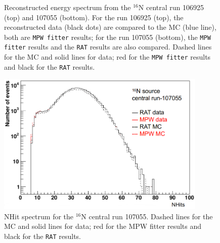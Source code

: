 \begin{figure}[htbp]
	\centering
	\caption[Reconstructed energy spectrum from the $^{16}$N central run 106925 and 107055.]{Reconstructed energy spectrum from the $^{16}$N central run 106925 (top) and 107055 (bottom). For the run 106925 (top), the reconstructed data (black dots) are compared to the MC (blue line), both are \texttt{MPW fitter} results; for the run 107055 (bottom), the \texttt{MPW fitter} results and the \texttt{RAT} results are also compared. Dashed lines for the MC and solid lines for data; red for the \texttt{MPW fitter} results and black for the \texttt{RAT} results.}
	\label{fig:N16energy}	
\end{figure}

\begin{figure}[htbp]
	\centering
	\includegraphics[width=10cm]{N16_nhits_107055.png}
	\caption[NHit spectrum for the $^{16}$N central run 107055.]{NHit spectrum for the $^{16}$N central run 107055. Dashed lines for the MC and solid lines for data; red for the MPW fitter results and black for the \texttt{RAT} results.}
	\label{N16nhits}
\end{figure}

